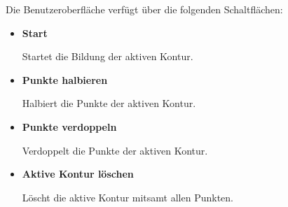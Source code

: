 Die Benutzeroberfläche verfügt über die folgenden Schaltflächen:
\begin{itemize}
    \item \textbf{Start}

        Startet die Bildung der aktiven Kontur.

    \item \textbf{Punkte halbieren}

        Halbiert die Punkte der aktiven Kontur.

    \item \textbf{Punkte verdoppeln}

        Verdoppelt die Punkte der aktiven Kontur.

    \item \textbf{Aktive Kontur löschen}

        Löscht die aktive Kontur mitsamt allen Punkten.
\end{itemize}
